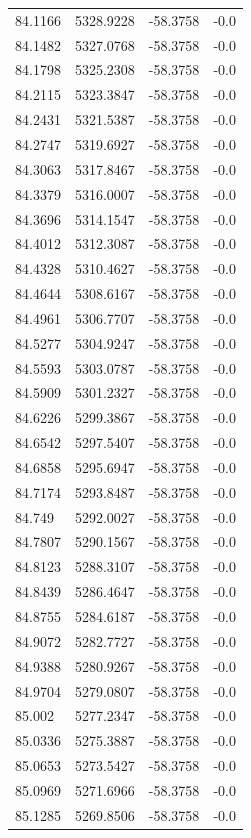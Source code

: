 \begin{table}[H]
\begin{tabular}{llll}
84.1166 & 5328.9228 & -58.3758 & -0.0 \\
84.1482 & 5327.0768 & -58.3758 & -0.0 \\
84.1798 & 5325.2308 & -58.3758 & -0.0 \\
84.2115 & 5323.3847 & -58.3758 & -0.0 \\
84.2431 & 5321.5387 & -58.3758 & -0.0 \\
84.2747 & 5319.6927 & -58.3758 & -0.0 \\
84.3063 & 5317.8467 & -58.3758 & -0.0 \\
84.3379 & 5316.0007 & -58.3758 & -0.0 \\
84.3696 & 5314.1547 & -58.3758 & -0.0 \\
84.4012 & 5312.3087 & -58.3758 & -0.0 \\
84.4328 & 5310.4627 & -58.3758 & -0.0 \\
84.4644 & 5308.6167 & -58.3758 & -0.0 \\
84.4961 & 5306.7707 & -58.3758 & -0.0 \\
84.5277 & 5304.9247 & -58.3758 & -0.0 \\
84.5593 & 5303.0787 & -58.3758 & -0.0 \\
84.5909 & 5301.2327 & -58.3758 & -0.0 \\
84.6226 & 5299.3867 & -58.3758 & -0.0 \\
84.6542 & 5297.5407 & -58.3758 & -0.0 \\
84.6858 & 5295.6947 & -58.3758 & -0.0 \\
84.7174 & 5293.8487 & -58.3758 & -0.0 \\
84.749 & 5292.0027 & -58.3758 & -0.0 \\
84.7807 & 5290.1567 & -58.3758 & -0.0 \\
84.8123 & 5288.3107 & -58.3758 & -0.0 \\
84.8439 & 5286.4647 & -58.3758 & -0.0 \\
84.8755 & 5284.6187 & -58.3758 & -0.0 \\
84.9072 & 5282.7727 & -58.3758 & -0.0 \\
84.9388 & 5280.9267 & -58.3758 & -0.0 \\
84.9704 & 5279.0807 & -58.3758 & -0.0 \\
85.002 & 5277.2347 & -58.3758 & -0.0 \\
85.0336 & 5275.3887 & -58.3758 & -0.0 \\
85.0653 & 5273.5427 & -58.3758 & -0.0 \\
85.0969 & 5271.6966 & -58.3758 & -0.0 \\
85.1285 & 5269.8506 & -58.3758 & -0.0 \\

\end{tabular}
\end{table}
